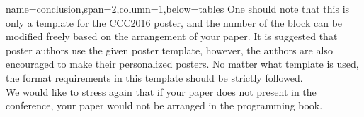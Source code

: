 \documentclass[a0paper,portrait]{baposter}      %
\begin{document}
\begin{poster}
{name=conclusion,span=2,column=1,below=tables}{
\setlength{\parindent}{1.5em} One should note that this is only a template for the CCC2016 poster, and the number of the block can be modified freely based on the arrangement of your paper. It is suggested that poster authors use the given poster template, however, the authors are also encouraged to make their personalized posters. No matter what template is used, the format requirements in this template
should be strictly followed.\\
\setlength{\parindent}{1.5em} We would like to stress again that if your paper does not present in the conference, your paper would not be arranged in the programming book.\vspace{1mm}}

\end{poster}
\end{document}
